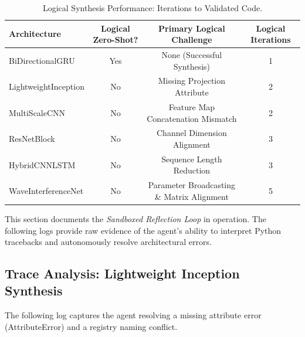 \documentclass{article}
\begin{document}
\begin{table}[H]
\centering
\caption{Logical Synthesis Performance: Iterations to Validated Code.}
\label{tab:gen_stats}
\begin{tabular}{lccc}
\toprule
\textbf{Architecture} & \textbf{Logical Zero-Shot?} & \textbf{Primary Logical Challenge} & \textbf{Logical Iterations} \\
\midrule
BiDirectionalGRU      & Yes & None (Successful Synthesis)       & 1 \\
LightweightInception  & No  & Missing Projection Attribute      & 2 \\
MultiScaleCNN         & No  & Feature Map Concatenation Mismatch & 2 \\
ResNetBlock           & No  & Channel Dimension Alignment       & 3 \\
HybridCNNLSTM         & No  & Sequence Length Reduction         & 3 \\
WaveInterferenceNet   & No  & Parameter Broadcasting \& Matrix Alignment & 5 \\
\bottomrule
\end{tabular}
\end{table}

This section documents the \textit{Sandboxed Reflection Loop} in operation. The following logs provide raw evidence of the agent's ability to interpret Python tracebacks and autonomously resolve architectural errors.


\newpage
\subsection{Trace Analysis: Lightweight Inception Synthesis}
The following log captures the agent resolving a missing attribute error (AttributeError) and a registry naming conflict.
\end{document}

